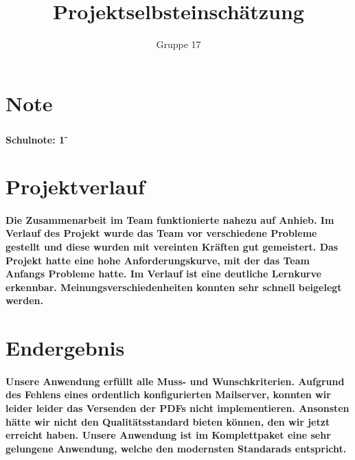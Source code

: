 \documentclass[a4paper]{article}
\author{Gruppe 17}
\date{}
\title{
\normalfont
\normalsize
\huge{Projektselbsteinschätzung}
}
\begin{document}
\maketitle
\newpage
\tableofcontents
\newpage
\section{Note}
\paragraph{Schulnote: 1\textsuperscript{-}}
\section{Projektverlauf}
\paragraph{Die Zusammenarbeit im Team funktionierte nahezu auf Anhieb. Im Verlauf des Projekt wurde das Team vor verschiedene Probleme gestellt und diese wurden mit vereinten Kräften gut gemeistert. Das Projekt hatte eine hohe Anforderungskurve, mit der das Team Anfangs Probleme hatte. Im Verlauf ist eine deutliche Lernkurve erkennbar. Meinungsverschiedenheiten konnten sehr schnell beigelegt werden.}
\section{Endergebnis}
\paragraph{Unsere Anwendung erfüllt alle Muss- und Wunschkriterien. Aufgrund des Fehlens eines ordentlich konfigurierten Mailserver, konnten wir leider leider das Versenden der PDFs nicht implementieren. Ansonsten hätte wir nicht den Qualitätsstandard bieten können, den wir jetzt erreicht haben. Unsere Anwendung ist im Komplettpaket eine sehr gelungene Anwendung, welche den modernsten Standarads entspricht.}
\end{document}
